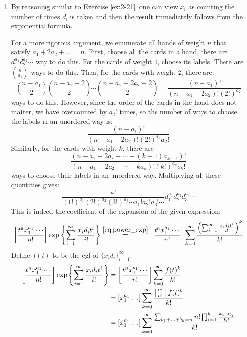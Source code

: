 \begin{solution}
    \begin{enumerate}[label=(\alph*)]
        \item \hypertarget{eq:ch3:22:a}{} By reasoning similar to Exercise \ref{ex:2-21}, one can view $x_i$ as counting the number of times $d_i$ is taken and then the result immediately follows from the exponential formula.
        
        For a more rigorous argument, we enumerate all hands of weight $n$ that satisfy $a_1 + 2a_2 + \ldots = n$. First, choose all the cards in a hand, there are $d_1^{a_1}d_2^{a_2}\cdots$ way to do this. For the cards of weight $1$, choose its labels. There are $\binom{n}{a_1}$ ways to do this. Then, for the cards with weight $2$, there are:
        \[
            \binom{n-a_1}{2} \binom{n-a_1-2}{2}\cdots \binom{n-a_1-2a_2 + 2}{2} = \frac{(n-a_1)!}{(n-a_1-2a_2)!(2!)^{a_2}}
        \]
        ways to do this. However, since the order of the cards in the hand does not matter, we have overcounted by $a_2!$ times, so the number of ways to choose the labels in an unordered way is:
        \[
           \frac{(n-a_1)!}{(n-a_1-2a_2)!(2!)^{a_2}a_2!}
        \]
        Similarly, for the cards with weight $k$, there are
        \[
            \frac{(n-a_1-2a_2-\cdots - (k-1)a_{k-1})!}{(n-a_1-2a_2-\cdots - ka_k)! (k!)^{a_k}a_k!}
        \]
        ways to choose their labels in an unordered way. Multiplying all these quantities gives:
        \[
            \frac{n!}{(1!)^{a_1}(2!)^{a_2}(3!)^{a_3}\cdots a_1!a_2!a_3!\cdots}d_1^{a_1}d_2^{a_2}d_3^{a_3}\cdots
        \]
        This is indeed the coefficient of the expansion of the given expression:
        \[
            \coeff{\frac{t^nx_1^{a_1}\cdots}{n!}} \exp\left\{\sum_{i=1}^\infty \frac{x_id_it^i}{i!}\right\} \estep{\eqref{eq:power_exp}} \coeff{\frac{t^nx_1^{a_1}\cdots}{n!}} \bsum[k] \frac{\left(\sum_{i=1}^\infty\frac{x_id_it^i}{i!}\right)^k}{k!}
        \]
        Define $f(t)$ to be the egf of $\{x_i d_i\}_{i= 1}^\infty$:
        \begin{align*}
            \coeff{\frac{t^nx_1^{a_1}\cdots}{n!}}  \exp\left\{\sum_{i=1}^\infty \frac{x_id_it^i}{i!}\right\} &= \coeff{\frac{t^nx_1^{a_1}\cdots}{n!}}  \bsum[k] \frac{f(t)^k}{k!} \\
            &= \coeff{x_1^{a_1}\ldots}\bsum[k] \frac{\coeff{\frac{t^n}{n!}} f(t)^k}{k!} \\
            &= \coeff{x_1^{a_1}\ldots}\bsum[k] \frac{\sum_{b_1+\ldots + b_k = n} n! \prod_{i=1}^{k} \frac{x_{b_i}d_{b_i}}{b_i!}}{k!} \\

\end{align*}
\end{enumerate}
\end{solution}
